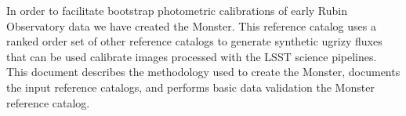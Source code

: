 In order to facilitate bootstrap photometric calibrations of early Rubin Observatory data we have created the Monster. 
This reference catalog uses a ranked order set of other reference catalogs to generate synthetic ugrizy fluxes that can be used calibrate images processed with the LSST science pipelines. 
This document describes the methodology used to create the Monster, documents the input reference catalogs, and performs basic data validation the Monster reference catalog.